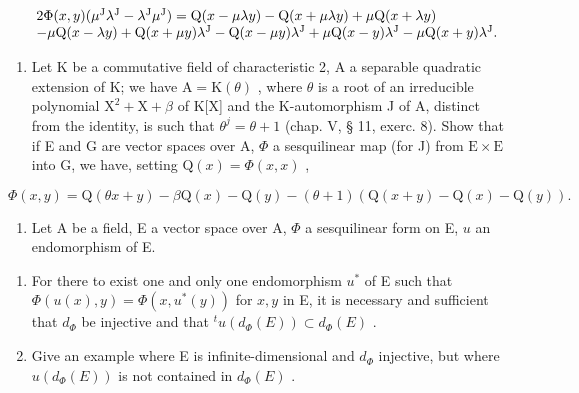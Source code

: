 \[
\begin{array}{r l} & {2 \Phi (x, y) (\mu^ {\mathrm{J}} \lambda^ {\mathrm{J}} - \lambda^ {\mathrm{J}} \mu^ {\mathrm{J}}) = \mathrm{Q} (x - \mu \lambda y) - \mathrm{Q} (x + \mu \lambda y) + \mu \mathrm{Q} (x + \lambda y)} \\ & {- \mu \mathrm{Q} (x - \lambda y) + \mathrm{Q} (x + \mu y) \lambda^ {\mathrm{J}} - \mathrm{Q} (x - \mu y) \lambda^ {\mathrm{J}} + \mu \mathrm{Q} (x - y) \lambda^ {\mathrm{J}} - \mu \mathrm{Q} (x + y) \lambda^ {\mathrm{J}}.} \end{array}
\]

\begin{enumerate}
\def\labelenumi{\arabic{enumi})}
\setcounter{enumi}{4}
\tightlist
\item
  Let K be a commutative field of characteristic 2, A a separable quadratic extension of K; we have \(\mathrm{A} = \mathrm{K}(\theta)\) , where \(\theta\) is a root of an irreducible polynomial \(\mathrm{X}^2 +\mathrm{X} + \beta\) of K{[}X{]} and the K-automorphism J of A, distinct from the identity, is such that \(\theta^{j} = \theta +1\) (chap. V, § 11, exerc. 8). Show that if E and G are vector spaces over A, \(\Phi\) a sesquilinear map (for J) from \(\mathrm{E}\times \mathrm{E}\) into G, we have, setting \(\mathrm{Q}(x) = \Phi (x,x)\) ,
\end{enumerate}

\[
\Phi (x, y) = \mathrm{Q} (\theta x + y) - \beta \mathrm{Q} (x) - \mathrm{Q} (y) - (\theta + 1) (\mathrm{Q} (x + y) - \mathrm{Q} (x) - \mathrm{Q} (y)).
\]

\begin{enumerate}
\def\labelenumi{\arabic{enumi})}
\setcounter{enumi}{5}
\tightlist
\item
  Let A be a field, E a vector space over A, \(\Phi\) a sesquilinear form on E, \(u\) an endomorphism of E.
\end{enumerate}

\begin{enumerate}
\def\labelenumi{\alph{enumi})}
\item
  For there to exist one and only one endomorphism \(u^*\) of E such that \(\Phi(u(x), y) = \Phi(x, u^*(y))\) for \(x, y\) in E, it is necessary and sufficient that \(d_\Phi\) be injective and that \(^t u(d_\Phi(E)) \subset d_\Phi(E)\) .
\item
  Give an example where E is infinite-dimensional and \(d_{\Phi}\) injective, but where \(u(d_{\Phi}(E))\) is not contained in \(d_{\Phi}(E)\) .
\end{enumerate}

